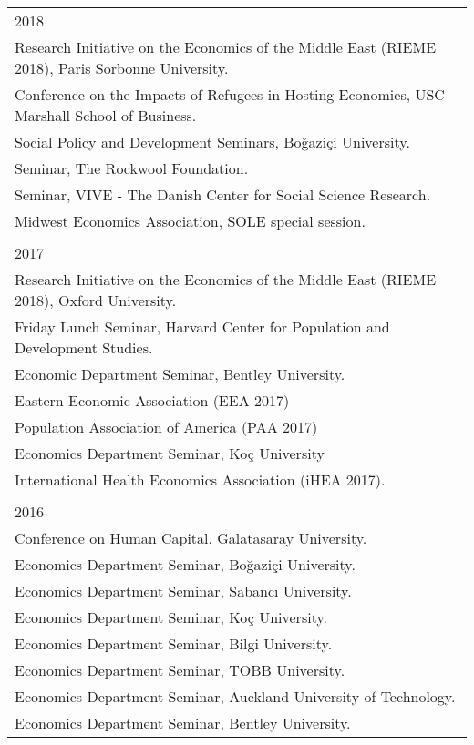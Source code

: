 \documentclass[12 pt]{article}
\begin{document}
\begin{longtable}{ccccc}
\multicolumn{5}{l}{2018} \\
\multicolumn{5}{l}{Research Initiative on the Economics of the Middle East (RIEME 2018), Paris Sorbonne University.}\\ 
     \multicolumn{5}{l}{Conference on the Impacts of Refugees in Hosting Economies,  USC Marshall School of Business.} \\
      \multicolumn{5}{l}{Social Policy and Development Seminars, Bo\u{g}azi\c{c}i University.} \\
   \multicolumn{5}{l}{Seminar, The Rockwool Foundation.}\\
         \multicolumn{5}{l}{Seminar, VIVE - The Danish Center for Social Science Research.} \\
      \multicolumn{5}{l}{Midwest Economics Association, SOLE special session.} \\
\\
  \multicolumn{5}{l}{2017}\\
      \multicolumn{5}{l}{Research Initiative on the Economics of the Middle East (RIEME 2018), Oxford University.} \\
 \multicolumn{5}{l}{Friday Lunch Seminar, Harvard Center for Population and Development Studies.}\\
  \multicolumn{5}{l}{Economic Department Seminar, Bentley University.  }\\
  \multicolumn{5}{l}{Eastern Economic Association (EEA 2017)} \\  
  \multicolumn{5}{l}{Population Association of America (PAA 2017)} \\
    \multicolumn{5}{l}{Economics Department Seminar, Ko\c{c} University} \\
    \multicolumn{5}{l}{International Health Economics Association (iHEA 2017).}\\
  

\\
   
   \multicolumn{5}{l}{2016}\\

\multicolumn{5}{l}{Conference on Human Capital, Galatasaray University.}   \\
\multicolumn{5}{l}{Economics Department Seminar, Bo\u{g}azi\c{c}i University.}   \\
\multicolumn{5}{l}{Economics Department Seminar, Sabanc{\i} University.}   \\
\multicolumn{5}{l}{Economics Department Seminar, Ko\c{c} University.}   \\
\multicolumn{5}{l}{Economics Department Seminar, Bilgi University.}   \\
\multicolumn{5}{l}{Economics Department Seminar, TOBB University.}   \\
\multicolumn{5}{l}{Economics Department Seminar, Auckland University of Technology.}   \\
\multicolumn{5}{l}{Economics Department Seminar, Bentley University.}   \\



\end{longtable}
\end{document}
